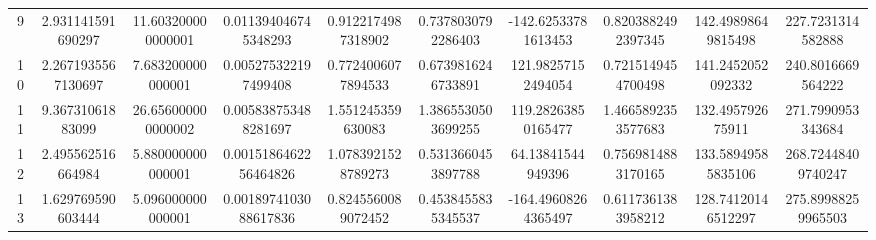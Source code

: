 \begin{table}
\begin{tabular}{cccccccccc}
9 & 2.931141591690297 & 11.603200000000001 & 0.011394046745348293 & 0.9122174987318902 & 0.7378030792286403 & -142.62533781613453 & 0.8203882492397345 & 142.49898649815498 & 227.7231314582888 \\
10 & 2.2671935567130697 & 7.683200000000001 & 0.005275322197499408 & 0.7724006077894533 & 0.6739816246733891 & 121.98257152494054 & 0.7215149454700498 & 141.2452052092332 & 240.8016669564222 \\
11 & 9.36731061883099 & 26.656000000000002 & 0.005838753488281697 & 1.551245359630083 & 1.3865530503699255 & 119.28263850165477 & 1.4665892353577683 & 132.495792675911 & 271.7990953343684 \\
12 & 2.495562516664984 & 5.880000000000001 & 0.0015186462256464826 & 1.0783921528789273 & 0.5313660453897788 & 64.13841544949396 & 0.7569814883170165 & 133.58949585835106 & 268.72448409740247 \\
13 & 1.629769590603444 & 5.096000000000001 & 0.0018974103088617836 & 0.8245560089072452 & 0.4538455835345537 & -164.49608264365497 & 0.6117361383958212 & 128.74120146512297 & 275.89988259965503 \\
\end{tabular}
\end{table}
